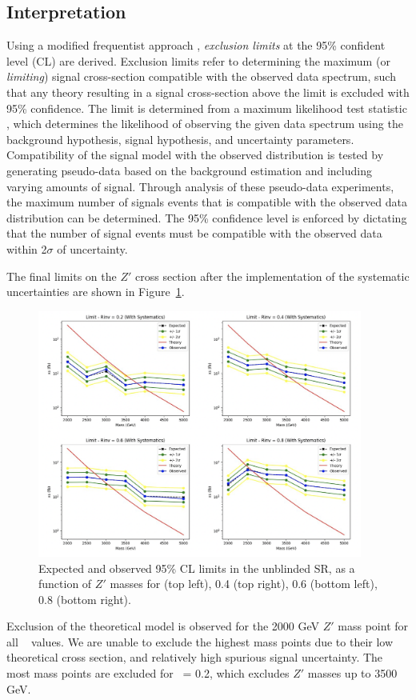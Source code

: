 \clearpage
\subsection{Interpretation}
Using a modified frequentist approach \cite{freq}, \textit{exclusion limits} at the 95\% confident level (CL) are derived.
Exclusion limits refer to determining the maximum (or \textit{limiting}) signal cross-section compatible with the observed data spectrum, such that any theory resulting in a signal cross-section above the limit is excluded with 95\% confidence. 
The limit is determined from a maximum likelihood test statistic \cite{likelihood}, which determines the likelihood of observing the given data spectrum using the background hypothesis, signal hypothesis, and uncertainty parameters.
Compatibility of the signal model with the observed distribution is tested by generating pseudo-data based on the background estimation and including varying amounts of signal.
Through analysis of these pseudo-data experiments, the maximum number of signals events that is compatible with the observed data distribution can be determined.
The 95\% confidence level is enforced by dictating that the number of signal events must be compatible with the observed data within 2$\sigma$ of uncertainty.

The final limits on the $Z'$ cross section after the implementation of the systematic uncertainties are shown in Figure~\ref{fig:unblinded_limits_syst}. 
\begin{figure}[!htbp]
\centering
   \includegraphics[width=0.95\textwidth]{figures/results/final_limits}
    \caption{Expected and observed 95\% CL limits in the unblinded SR, as a function of $Z'$ masses for  (top left), 0.4 (top right), 0.6 (bottom left), 0.8 (bottom right).
    \label{fig:unblinded_limits_syst}}
\end{figure}
Exclusion of the theoretical model is observed for the 2000 GeV $Z'$ mass point for all \rinv~ values.
We are unable to exclude the highest mass points due to their low theoretical cross section, and relatively high spurious signal uncertainty.
The most mass points are excluded for \rinv~= 0.2, which excludes $Z'$ masses up to 3500 GeV.

